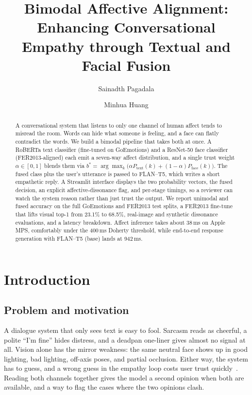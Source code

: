 \documentclass[sigconf,nonacm]{acmart}
\title[Bimodal Affective Alignment]{Bimodal Affective Alignment: Enhancing Conversational Empathy through Textual and Facial Fusion}
\author{Sainadth Pagadala}
\affiliation{%
  \department{College of Engineering and Computer Science}
  \institution{Texas A\&M University--Corpus Christi}
  \city{Corpus Christi}
  \state{TX}
  \postcode{78412}
  \country{USA}}
\author{Minhua Huang}
\affiliation{%
  \department{College of Engineering and Computer Science}
  \institution{Texas A\&M University--Corpus Christi}
  \city{Corpus Christi}
  \state{TX}
  \postcode{78412}
  \country{USA}}
\begin{document}
\begin{abstract}
A conversational system that listens to only one channel of human affect tends to misread the room. Words can hide what someone is feeling, and a face can flatly contradict the words. We build a bimodal pipeline that takes both at once. A RoBERTa text classifier (fine-tuned on GoEmotions) and a ResNet-50 face classifier (FER2013-aligned) each emit a seven-way affect distribution, and a single trust weight $\alpha\in[0,1]$ blends them via
$b^*=\arg\max_k\bigl(\alpha P_\text{text}(k)+(1\!-\!\alpha)P_\text{face}(k)\bigr)$.
The fused class plus the user's utterance is passed to FLAN--T5, which writes a short empathetic reply. A Streamlit interface displays the two probability vectors, the fused decision, an explicit affective-dissonance flag, and per-stage timings, so a reviewer can watch the system reason rather than just trust the output. We report unimodal and fused accuracy on the full GoEmotions and FER2013 test splits, a FER2013 fine-tune that lifts visual top-1 from 23.1\% to 68.5\%, real-image and synthetic dissonance evaluations, and a latency breakdown. Affect inference takes about 38\,ms on Apple MPS, comfortably under the 400\,ms Doherty threshold, while end-to-end response generation with FLAN--T5 (base) lands at 942\,ms.
\end{abstract}

\maketitle

\section{Introduction}
\subsection{Problem and motivation}
A dialogue system that only sees text is easy to fool. Sarcasm reads as cheerful, a polite ``I'm fine'' hides distress, and a deadpan one-liner gives almost no signal at all. Vision alone has the mirror weakness: the same neutral face shows up in good lighting, bad lighting, off-axis poses, and partial occlusion. Either way, the system has to guess, and a wrong guess in the empathy loop costs user trust quickly~\cite{card1983human}. Reading both channels together gives the model a second opinion when both are available, and a way to flag the cases where the two opinions clash.
\end{document}

